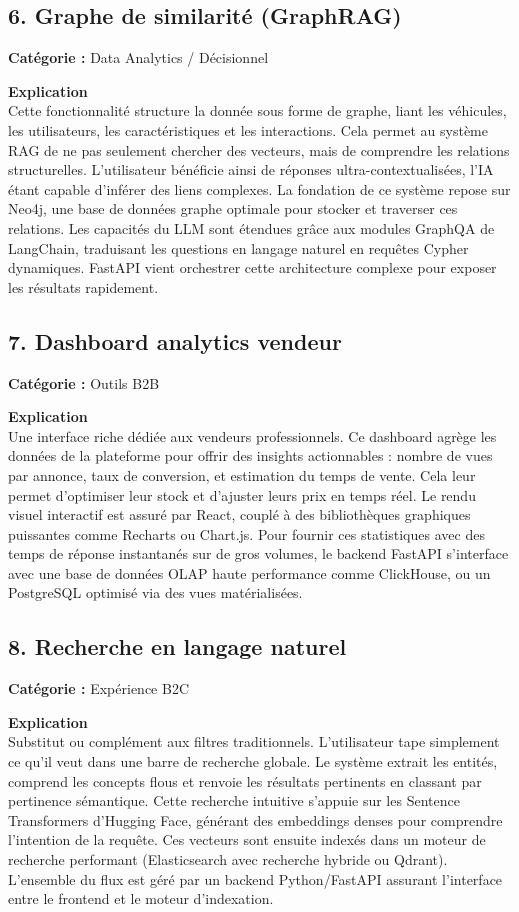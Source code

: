 \documentclass[11pt,a4paper]{article}
\begin{document}
\subsection{6. Graphe de similarité (GraphRAG)}
\textbf{Catégorie :} Data Analytics / Décisionnel

\textbf{Explication}\\
Cette fonctionnalité structure la donnée sous forme de graphe, liant les véhicules, les utilisateurs, les caractéristiques et les interactions. Cela permet au système RAG de ne pas seulement chercher des vecteurs, mais de comprendre les relations structurelles. L'utilisateur bénéficie ainsi de réponses ultra-contextualisées, l'IA étant capable d'inférer des liens complexes. La fondation de ce système repose sur Neo4j, une base de données graphe optimale pour stocker et traverser ces relations. Les capacités du LLM sont étendues grâce aux modules GraphQA de LangChain, traduisant les questions en langage naturel en requêtes Cypher dynamiques. FastAPI vient orchestrer cette architecture complexe pour exposer les résultats rapidement.

\subsection{7. Dashboard analytics vendeur}
\textbf{Catégorie :} Outils B2B

\textbf{Explication}\\
Une interface riche dédiée aux vendeurs professionnels. Ce dashboard agrège les données de la plateforme pour offrir des insights actionnables : nombre de vues par annonce, taux de conversion, et estimation du temps de vente. Cela leur permet d'optimiser leur stock et d'ajuster leurs prix en temps réel. Le rendu visuel interactif est assuré par React, couplé à des bibliothèques graphiques puissantes comme Recharts ou Chart.js. Pour fournir ces statistiques avec des temps de réponse instantanés sur de gros volumes, le backend FastAPI s'interface avec une base de données OLAP haute performance comme ClickHouse, ou un PostgreSQL optimisé via des vues matérialisées.

\subsection{8. Recherche en langage naturel}
\textbf{Catégorie :} Expérience B2C

\textbf{Explication}\\
Substitut ou complément aux filtres traditionnels. L'utilisateur tape simplement ce qu'il veut dans une barre de recherche globale. Le système extrait les entités, comprend les concepts flous et renvoie les résultats pertinents en classant par pertinence sémantique. Cette recherche intuitive s'appuie sur les Sentence Transformers d'Hugging Face, générant des embeddings denses pour comprendre l'intention de la requête. Ces vecteurs sont ensuite indexés dans un moteur de recherche performant (Elasticsearch avec recherche hybride ou Qdrant). L'ensemble du flux est géré par un backend Python/FastAPI assurant l'interface entre le frontend et le moteur d'indexation.
\end{document}
